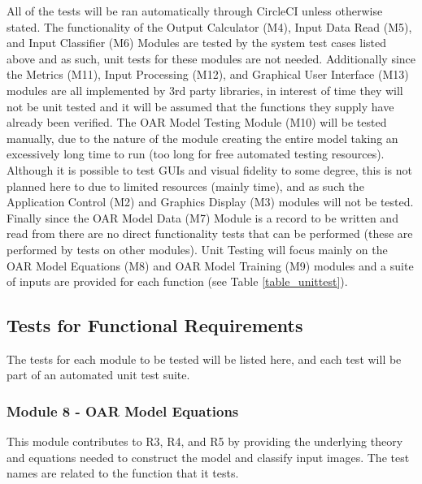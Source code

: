 \documentclass[12pt, titlepage]{article}
\begin{document}
All of the tests will be ran automatically through CircleCI \cite{CircleCI} unless otherwise stated.
The functionality of the Output Calculator (M4), Input Data Read (M5), and Input Classifier (M6) Modules are tested by the
system test cases listed above and as such, unit tests for these modules are not needed. Additionally since the Metrics (M11), Input Processing (M12),
and Graphical User Interface (M13) modules are all implemented by 3rd party libraries, in interest of time they will not be unit tested and it 
will be assumed that the functions they supply have already been verified. The OAR Model Testing Module (M10) will be tested manually, due to the nature of the
module creating the entire model taking an excessively long time to run (too long for free automated testing resources). Although it is possible to test GUIs and visual fidelity to some degree, this
is not planned here to due to limited resources (mainly time), and as such the Application Control (M2) and Graphics Display (M3) modules will not be tested.
Finally since the OAR Model Data (M7) Module is a record to be written and read from there are no direct functionality tests that can be performed 
(these are performed by tests on other modules). 
Unit Testing will focus mainly on the OAR Model Equations (M8) and OAR Model Training (M9) modules and a suite of inputs are provided for each function (see Table \ref{table_unittest}).

\subsection{Tests for Functional Requirements}

The tests for each module to be tested will be listed here, and each test will be part of an automated unit test suite.

\subsubsection{Module 8 - OAR Model Equations}
This module contributes to R3, R4, and R5 by providing the underlying theory and equations needed to construct the model and classify input images.
The test names are related to the function that it tests.
\end{document}
